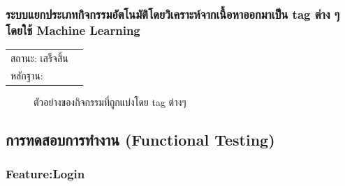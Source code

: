 \documentclass[14pt,oneside,openright,a4paper]{cpe-thai-project}
\begin{document}
\newpage

\subsubsection{ระบบแยกประเภทกิจกรรมอัตโนมัติโดยวิเคราะห์จากเนื้อหาออกมาเป็น tag ต่าง ๆ โดยใช้ Machine Learning}
\begin{tabular}{@{}p{2cm}p{10cm}@{}}
  สถานะ: เสร็จสิ้น \\
  หลักฐาน: & \\
\end{tabular}
\begin{figure}[!h]\centering
  \setlength{\fboxrule}{0.5mm} %
  \setlength{\fboxsep}{0.5cm}
  \caption{ตัวอย่างของกิจกรรมที่ถูกแบ่งโดย tag ต่างๆ}\label{fig:sinfo}
\end{figure}

\newpage

\subsection{การทดสอบการทำงาน (Functional Testing)}
\subsubsection{Feature:Login}
\end{document}
